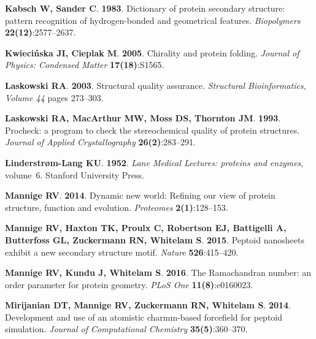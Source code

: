 \documentclass[fleqn,10pt,lineno]{wlpeerj} %
\begin{document}
\begin{thebibliography}{60}
\textbf{Kabsch W, Sander C}. \textbf{1983}.
\newblock Dictionary of protein secondary structure: pattern recognition of
  hydrogen-bonded and geometrical features.
\newblock \emph{Biopolymers} \textbf{22(12)}:2577--2637.

\textbf{Kwieci{\'n}ska JI, Cieplak M}. \textbf{2005}.
\newblock Chirality and protein folding.
\newblock \emph{Journal of Physics: Condensed Matter} \textbf{17(18)}:S1565.

\textbf{Laskowski RA}. \textbf{2003}.
\newblock Structural quality assurance.
\newblock \emph{Structural Bioinformatics, Volume 44} pages 273--303.

\textbf{Laskowski RA, MacArthur MW, Moss DS, Thornton JM}. \textbf{1993}.
\newblock Procheck: a program to check the stereochemical quality of protein
  structures.
\newblock \emph{Journal of Applied Crystallography} \textbf{26(2)}:283--291.

\textbf{Linderstr{\o}m-Lang KU}. \textbf{1952}.
\newblock \emph{Lane Medical Lectures: proteins and enzymes}, volume~6.
\newblock Stanford University Press.

\textbf{Mannige RV}. \textbf{2014}.
\newblock Dynamic new world: Refining our view of protein structure, function
  and evolution.
\newblock \emph{Proteomes} \textbf{2(1)}:128--153.

\textbf{Mannige RV, Haxton TK, Proulx C, Robertson EJ, Battigelli A, Butterfoss
  GL, Zuckermann RN, Whitelam S}. \textbf{2015}.
\newblock Peptoid nanosheets exhibit a new secondary structure motif.
\newblock \emph{Nature} \textbf{526}:415--420.

\textbf{Mannige RV, Kundu J, Whitelam S}. \textbf{2016}.
\newblock The {R}amachandran number: an order parameter for protein geometry.
\newblock \emph{PLoS One} \textbf{11(8)}:e0160023.

\textbf{Mirijanian DT, Mannige RV, Zuckermann RN, Whitelam S}. \textbf{2014}.
\newblock Development and use of an atomistic charmm-based forcefield for
  peptoid simulation.
\newblock \emph{Journal of Computational Chemistry} \textbf{35(5)}:360--370.


\end{thebibliography}
\end{document}
